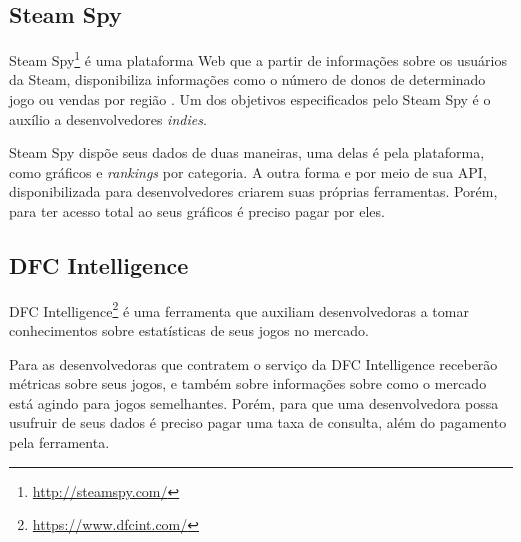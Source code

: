 \subsection{Steam Spy}
Steam Spy\footnote[2]{\url{http://steamspy.com/}} é uma plataforma Web que a partir de informações sobre os usuários da Steam, disponibiliza informações como o número de donos de determinado jogo ou vendas por região \cite{steam_spy}. Um dos objetivos especificados pelo Steam Spy é o auxílio a desenvolvedores \textit{indies}.

Steam Spy dispõe seus dados de duas maneiras, uma delas é pela plataforma, como gráficos e \textit{rankings} por categoria. A outra forma e por meio de sua API, disponibilizada para desenvolvedores criarem suas próprias ferramentas. Porém, para ter acesso total ao seus gráficos é preciso pagar por eles.

\subsection{DFC Intelligence}
DFC Intelligence\footnote[3]{\url{https://www.dfcint.com/}} é uma ferramenta que auxiliam desenvolvedoras a tomar conhecimentos sobre estatísticas de seus jogos no mercado.

Para as desenvolvedoras que contratem o serviço da DFC Intelligence receberão métricas sobre seus jogos, e também sobre informações sobre como o mercado está agindo para jogos semelhantes. Porém, para que uma desenvolvedora possa usufruir de seus dados é preciso pagar uma taxa de consulta, além do pagamento pela ferramenta.